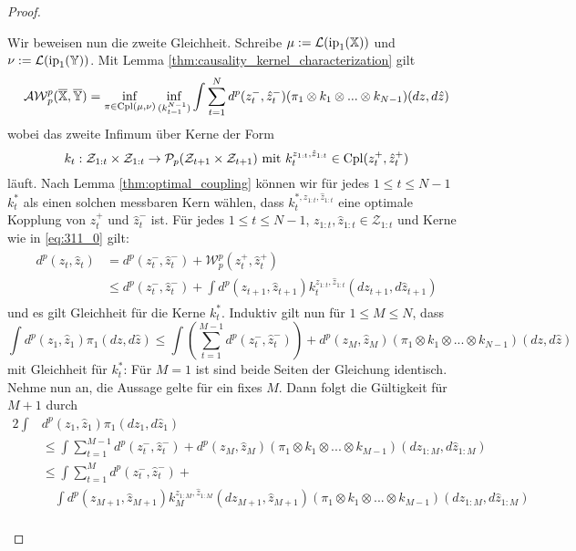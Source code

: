 \begin{proof}
\begin{enumerate}[(i)]
Wir beweisen nun die zweite Gleichheit. Schreibe $\mu := \mathcal{L}(\operatorname{ip}_1(\mathbb{X}))$ und $\nu := \mathcal{L}(\operatorname{ip}_1(\mathbb{Y}))$. Mit Lemma \ref{thm:causality_kernel_characterization} gilt
$$\mathcal{AW}_p^p(\overline{\mathbb{X}}, \overline{\mathbb{Y}}) = \inf_{\pi \in \operatorname{Cpl}(\mu, \nu)} \inf_{(k_{t=1}^{N-1})} \int \sum_{t=1}^{N}d^p(z_t^-, \hat{z}_t^-) (\pi_1 \otimes k_1 \otimes ... \otimes k_{N-1})(dz, d\hat{z})$$
wobei das zweite Infimum über Kerne der Form
\begin{equation}\label{eq:311_0}
k_t: \mathcal{Z}_{1:t}\times \mathcal{Z}_{1:t} \rightarrow \mathcal{P}_p(\mathcal{Z}_{t+1}\times \mathcal{Z}_{t+1}) \text{ mit } k_t^{z_{1:t}, \hat{z}_{1:t}} \in \operatorname{Cpl}(z_t^+, \hat{z}_t^+)
\end{equation}
läuft. Nach Lemma \ref{thm:optimal_coupling} können wir für jedes $1 \leq t \leq N-1$ $k_t^*$ als einen solchen messbaren Kern wählen, dass $k_t^{*, z_{1:t}, \hat{z}_{1:t}}$ eine optimale Kopplung von $z_t^+$ und $\hat{z}_t^-$ ist. Für jedes $1\leq t\leq N-1$, $z_{1:t}, \hat{z}_{1:t} \in \mathcal{Z}_{1:t}$ und Kerne wie in \ref{eq:311_0} gilt:
\begin{align}\label{eq:311_1}
    \begin{split}
    d^p(z_t, \hat{z}_t) &= d^p(z_t^-, \hat{z}_t^-) + \mathcal{W}_p^p(z_t^+, \hat{z}_t^+) \\
    &\leq d^p(z_t^-, \hat{z}_t^-) + \int d^p(z_{t+1}, \hat{z}_{t+1}) k_t^{z_{1:t}, \hat{z}_{1:t}}(dz_{t+1}, d\hat{z}_{t+1})
    \end{split}
\end{align}
und es gilt Gleichheit für die Kerne $k_t^*$. Induktiv gilt nun für $1 \leq M \leq N$, dass
$$\int d^p(z_1, \hat{z}_1)\pi_1(dz, d\hat{z}) \leq \int \left(\sum_{t=1}^{M-1} d^p(z_t^-, \hat{z}_t^-)\right) +d^p(z_M, \hat{z}_M)(\pi_1 \otimes k_1 \otimes ... \otimes k_{N-1})(dz, d\hat{z})$$
mit Gleichheit für $k_t^*$: Für $M=1$ ist sind beide Seiten der Gleichung identisch. Nehme nun an, die Aussage gelte für ein fixes $M$. Dann folgt die Gültigkeit für $M+1$ durch
\begin{alignat*}{2}
\int &d^p(z_1, \hat{z}_1)\pi_1(dz_1, d\hat{z}_1) \\
&\leq \int \sum_{t=1}^{M-1} d^p(z_t^-, \hat{z}_t^-) +d^p(z_M, \hat{z}_M)(\pi_1 \otimes k_1 \otimes ... \otimes k_{M-1})(dz_{1:M}, d\hat{z}_{1:M}) \\
&\leq\int \sum_{t=1}^{M}d^p(z_t^-, \hat{z}_t^-) + \\
    &\quad\int d^p(z_{M+1}, \hat{z}_{M+1}) k_M^{z_{1:M}, \hat{z}_{1:M}}(dz_{M+1}, \hat{z}_{M+1}) (\pi_1 \otimes k_1 \otimes ... \otimes k_{M-1})(dz_{1:M}, d\hat{z}_{1:M})\\

\end{alignat*}
\end{enumerate}
\end{proof}
